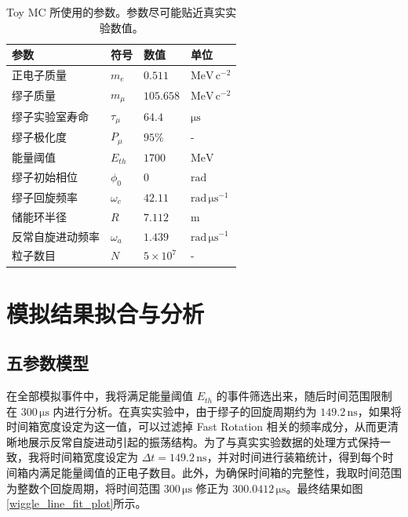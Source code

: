 \documentclass[a4paper,11pt,AutoFakeBold]{ctexart}
\begin{document}
\begin{table}[htbp]
\centering
\caption{Toy MC 所使用的参数。参数尽可能贴近真实实验数值。}
\begin{tabular}{llll}
\hline
\hline
参数 & 符号 & 数值 & 单位 \\
\hline
\hline
正电子质量\cite{NIST_electron_mass_energy_2022} & $m_e$ & $0.511$ & $\mathrm{MeV\,c^{-2}}$ \\
缪子质量\cite{NIST_muon_mass_energy_2022} & $m_\mu$ & $105.658$ & $\mathrm{MeV\,c^{-2}}$ \\
缪子实验室寿命\cite{PhysRevD.103.072002} & $\tau_\mu$ & $64.4$ & $\mathrm{\mu s}$ \\
缪子极化度\cite{PhysRevAccelBeams.24.044002} & $P_\mu$ & $95\%$ & - \\
能量阈值\cite{PhysRevD.103.072002} & $E_{th}$ & $1700$ & $\mathrm{MeV}$ \\
缪子初始相位 & $\phi_0$ & $0$ & $\mathrm{rad}$ \\
缪子回旋频率\cite{BOSTON2023} & $\omega_c$ & $42.11$ & $\mathrm{rad\,\mu s^{-1}}$ \\
储能环半径\cite{BOSTON2023} & $R$ & $7.112$ & $\mathrm{m}$ \\
反常自旋进动频率\cite{PhysRevLett.126.141801} & $\omega_a$ & $1.439$ & $\mathrm{rad\,\mu s^{-1}}$ \\
粒子数目 & $N$ & $5 \times 10^7$ & - \\
\hline
\hline
\end{tabular}
\end{table}

\section{模拟结果拟合与分析}

\subsection{五参数模型}

在全部模拟事件中，我将满足能量阈值 $E_{th}$ 的事件筛选出来，随后时间范围限制在 $300\,\mathrm{\mu s}$ 内进行分析。在真实实验中，由于缪子的回旋周期约为\cite{PhysRevD.103.072002} $149.2\,\mathrm{ns}$，如果将时间箱宽度设定为这一值，可以过滤掉 Fast Rotation 相关的频率成分\cite{BOSTON2023}，从而更清晰地展示反常自旋进动引起的振荡结构。为了与真实实验数据的处理方式保持一致，我将时间箱宽度设定为 $\Delta t = 149.2\,\mathrm{ns}$，并对时间进行装箱统计，得到每个时间箱内满足能量阈值的正电子数目。此外，为确保时间箱的完整性，我取时间范围为整数个回旋周期，将时间范围 $300\,\mathrm{\mu s}$ 修正为 $300.0412\,\mathrm{\mu s}$。最终结果如图\ref{wiggle_line_fit_plot}所示。
\end{document}
